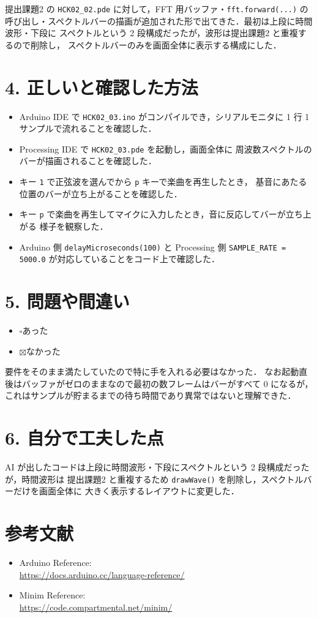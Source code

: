 \documentclass[a4paper,11pt,dvipdfmx]{jsarticle}
\newcommand{\cboxon}{$\boxtimes$}
\newcommand{\cboxoff}{$\square$}
\begin{document}
提出課題2 の \texttt{HCK02\_02.pde} に対して，FFT 用バッファ・\texttt{fft.forward(...)}
の呼び出し・スペクトルバーの描画が追加された形で出てきた．最初は上段に時間波形・下段に
スペクトルという 2 段構成だったが，波形は提出課題2 と重複するので削除し，
スペクトルバーのみを画面全体に表示する構成にした．

\section*{4. 正しいと確認した方法}
\begin{itemize}
  \item Arduino IDE で \texttt{HCK02\_03.ino} がコンパイルでき，シリアルモニタに
        1 行 1 サンプルで流れることを確認した．
  \item Processing IDE で \texttt{HCK02\_03.pde} を起動し，画面全体に
        周波数スペクトルのバーが描画されることを確認した．
  \item キー \texttt{1} で正弦波を選んでから \texttt{p} キーで楽曲を再生したとき，
        基音にあたる位置のバーが立ち上がることを確認した．
  \item キー \texttt{p} で楽曲を再生してマイクに入力したとき，音に反応してバーが立ち上がる
        様子を観察した．
  \item Arduino 側 \texttt{delayMicroseconds(100)} と Processing 側
        \texttt{SAMPLE\_RATE = 5000.0} が対応していることをコード上で確認した．
\end{itemize}

\section*{5. 問題や間違い}
\begin{itemize}
  \item \cboxoff あった
  \item \cboxon なかった
\end{itemize}

要件をそのまま満たしていたので特に手を入れる必要はなかった．
なお起動直後はバッファがゼロのままなので最初の数フレームはバーがすべて 0 になるが，
これはサンプルが貯まるまでの待ち時間であり異常ではないと理解できた．

\section*{6. 自分で工夫した点}
AI が出したコードは上段に時間波形・下段にスペクトルという 2 段構成だったが，時間波形は
提出課題2 と重複するため \texttt{drawWave()} を削除し，スペクトルバーだけを画面全体に
大きく表示するレイアウトに変更した．

\section*{参考文献}
\begin{itemize}
  \item Arduino Reference: \\
        \url{https://docs.arduino.cc/language-reference/}
  \item Minim Reference: \\
        \url{https://code.compartmental.net/minim/}
\end{itemize}
\end{document}

